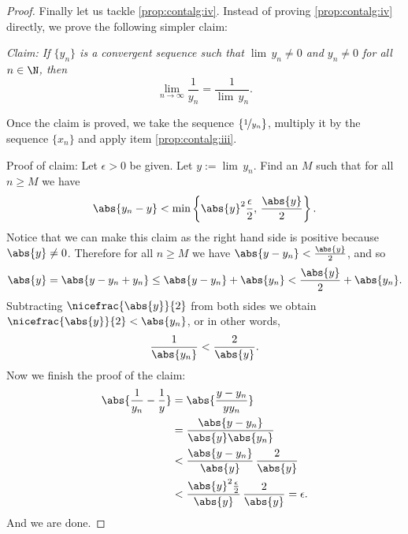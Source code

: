 \documentclass[12pt]{book}
\begin{document}
\begin{proof}
Finally let us tackle
\ref{prop:contalg:iv}.
Instead of proving 
\ref{prop:contalg:iv} directly, we prove the following simpler claim:

\emph{Claim: If $\{ y_n \}$ is a convergent sequence such that
$\lim\, y_n \not= 0$ and $y_n \not= 0$ for all $n \in \N$, then}
\begin{equation*}
\lim_{n\to\infty} \frac{1}{y_n} = \frac{1}{\lim\, y_n}  .
\end{equation*}

Once the claim is proved, we take the sequence $\{ \nicefrac{1}{y_n} \}$,
multiply it by the sequence $\{ x_n \}$ and apply item
\ref{prop:contalg:iii}.

Proof of claim:  Let $\epsilon > 0$ be given.
Let $y := \lim\, y_n$.
Find an $M$ such that for all $n \geq M$
we have
\begin{equation*}
\abs{y_n - y} < \min \left\{ \abs{y}^2\frac{\epsilon}{2}, \, \frac{\abs{y}}{2}
\right\} .
\end{equation*}
Notice that we can make this claim as the right hand side is positive
because $\abs{y} \not= 0$.
Therefore for all $n \geq M$ we have
$\abs{y - y_n} < \frac{\abs{y}}{2}$, and so
\begin{equation*}
\abs{y} = 
\abs{y - y_n + y_n } \leq
\abs{y - y_n} + \abs{ y_n } < \frac{\abs{y}}{2} + \abs{y_n}.
\end{equation*}
Subtracting $\nicefrac{\abs{y}}{2}$ from both sides we obtain
$\nicefrac{\abs{y}}{2} < \abs{y_n}$, or in other words,
\begin{equation*}
\frac{1}{\abs{y_n}} < \frac{2}{\abs{y}} .
\end{equation*}
Now we finish the proof of the claim:
\begin{equation*}
\begin{split}
\abs{\frac{1}{y_n} - \frac{1}{y}} &=
\abs{\frac{y - y_n}{y y_n}} \\
& =
\frac{\abs{y - y_n}}{\abs{y} \abs{y_n}} \\
& <
\frac{\abs{y - y_n}}{\abs{y}} \, \frac{2}{\abs{y}} \\
& <
\frac{\abs{y}^2 \frac{\epsilon}{2}}{\abs{y}} \, \frac{2}{\abs{y}}
= \epsilon .
\end{split}
\end{equation*}
And we are done.
\end{proof}
\end{document}
